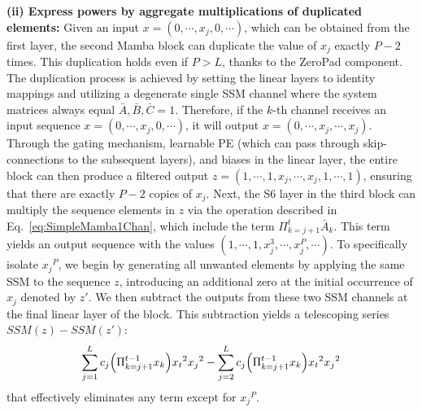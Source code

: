 {\noindent\textbf{(ii) Express powers by aggregate multiplications of duplicated elements:}} Given an input $x = (0, \cdots, x_j, 0, \cdots)$, which can be obtained from the first layer, the second Mamba block can duplicate the value of $x_j$ exactly $P-2$ times. This duplication holds even if $P > L$, thanks to the ZeroPad component. The duplication process is achieved by setting the linear layers to identity mappings and utilizing a degenerate single SSM channel where the system matrices always equal $\bar{A},\bar{B},\bar{C}=1$. Therefore, if the $k$-th channel receives an input sequence $x = (0, \cdots, x_j, 0, \cdots)$, it will output $x = (0, \cdots, x_j, \cdots, x_j)$.
Through the gating mechanism, learnable PE (which can pass through skip-connections to the subsequent layers), and biases in the linear layer, the entire block can then produce a filtered output $z = (1, \cdots, 1, x_j, \cdots, x_j, 1, \cdots, 1)$, ensuring that there are exactly $P-2$ copies of $x_j$.
Next, the S6 layer in the third block can multiply the sequence elements in $z$ via the operation described in Eq.~\ref{eq:SimpleMamba1Chan}, which include the term $\Pi_{k=j+1}^t \bar{A}_k$. This term yields an output sequence with the values $(1, \cdots, 1, x_j^3, \cdots, x_j^P, \cdots)$. To specifically isolate ${x_j}^P$, we begin by generating all unwanted elements by applying the same SSM to the sequence $z$, introducing an additional zero at the initial occurrence of $x_j$ denoted by $z'$. We then subtract the outputs from these two SSM channels at the final linear layer of the block. This subtraction yields a telescoping series $SSM(z) - SSM(z')$:
\vspace{-2pt}
{\small
\begin{equation}
\sum_{j=1}^L c_j \Big{(} \Pi_{k=j+1}^{t-1} x_k \Big{)} {x_t}^2 {x_j}^2 - \sum_{j=2}^L c_j \Big{(} \Pi_{k=j+1}^{t-1} x_k \Big{)} {x_t}^2 {x_j}^2
\vspace{-3pt}
\nonumber
\end{equation}
\vspace{-3pt}
}
%
that effectively eliminates any term except for ${x_j}^P$. %



